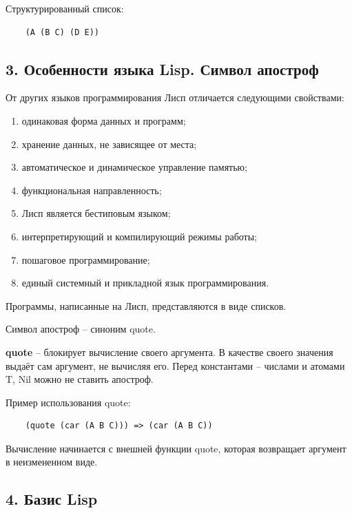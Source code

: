 Структурированный список:
\begin{lstlisting}
	(A (B C) (D E))
\end{lstlisting}

\subsection*{3. Особенности языка Lisp. Символ апостроф}

От других языков программирования Лисп отличается следующими свойствами:

\begin{enumerate}
\item одинаковая форма данных и программ;

\item хранение данных, не зависящее от места;

\item автоматическое и динамическое управление памятью;

\item функциональная направленность;

\item Лисп является бестиповым языком;

\item интерпретирующий и компилирующий режимы работы;

\item пошаговое программирование;

\item единый системный и прикладной язык программирования.
\end{enumerate}

Программы, написанные на Лисп, представляются в виде списков.


Символ апостроф -- синоним quote.

\textbf{quote} -- блокирует вычисление своего аргумента. В качестве своего значения выдаёт сам аргумент, не вычисляя его. Перед константами -- числами и атомами T, Nil можно не ставить апостроф.

Пример использования quote:
\begin{lstlisting}
	(quote (car (A B C))) => (car (A B C))
\end{lstlisting}



Вычисление начинается с внешней функции quote, которая возвращает аргумент в неизмененном виде.

\subsection*{4. Базис Lisp}

